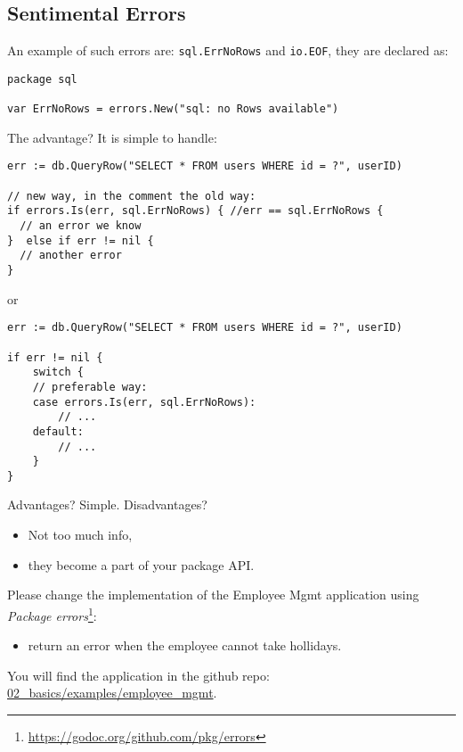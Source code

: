 \documentclass[11pt, letterpaper]{article}
\begin{document}
\subsection{Sentimental Errors}

An example of such errors are: \texttt{sql.ErrNoRows} and \texttt{io.EOF}, they are declared as:

\begin{verbatim}
package sql

var ErrNoRows = errors.New("sql: no Rows available")
\end{verbatim}

The advantage? It is simple to handle:

\begin{verbatim}
err := db.QueryRow("SELECT * FROM users WHERE id = ?", userID)

// new way, in the comment the old way:
if errors.Is(err, sql.ErrNoRows) { //err == sql.ErrNoRows {
  // an error we know
}  else if err != nil { 
  // another error
}
\end{verbatim}

or

\begin{verbatim}
err := db.QueryRow("SELECT * FROM users WHERE id = ?", userID)

if err != nil {
	switch {
	// preferable way:
	case errors.Is(err, sql.ErrNoRows):
		// ...
	default:
		// ...
	}
}
\end{verbatim}

Advantages? Simple. Disadvantages? \begin{itemize}%
\item Not too much info,
\item they become a part of your package {\small API}.
\end{itemize}%

\bigskip

Please change the implementation of the Employee Mgmt application using \emph{Package errors}\footnote{\href{https://godoc.org/github.com/pkg/errors}{https://godoc.org/github.com/pkg/errors}}: \begin{itemize}%
\item return an error when the employee cannot take hollidays.
\end{itemize}%


You will find the application in the github repo:\\
\href{https://github.com/wojciech11/workshop\_golang/tree/master/02\_basics/examples/employee\_mgmt}{02\_basics/examples/employee\_mgmt}.
\end{document}
